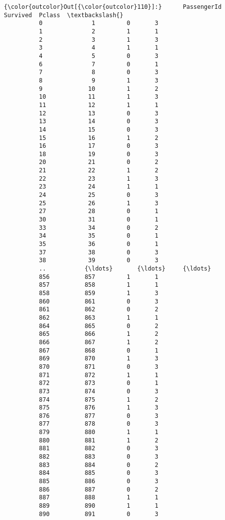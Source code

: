 \documentclass[11pt]{article}
\begin{document}
\begin{Verbatim}[commandchars=\\\{\}]
{\color{outcolor}Out[{\color{outcolor}110}]:}      PassengerId  Survived  Pclass  \textbackslash{}
          0              1         0       3   
          1              2         1       1   
          2              3         1       3   
          3              4         1       1   
          4              5         0       3   
          6              7         0       1   
          7              8         0       3   
          8              9         1       3   
          9             10         1       2   
          10            11         1       3   
          11            12         1       1   
          12            13         0       3   
          13            14         0       3   
          14            15         0       3   
          15            16         1       2   
          16            17         0       3   
          18            19         0       3   
          20            21         0       2   
          21            22         1       2   
          22            23         1       3   
          23            24         1       1   
          24            25         0       3   
          25            26         1       3   
          27            28         0       1   
          30            31         0       1   
          33            34         0       2   
          34            35         0       1   
          35            36         0       1   
          37            38         0       3   
          38            39         0       3   
          ..           {\ldots}       {\ldots}     {\ldots}   
          856          857         1       1   
          857          858         1       1   
          858          859         1       3   
          860          861         0       3   
          861          862         0       2   
          862          863         1       1   
          864          865         0       2   
          865          866         1       2   
          866          867         1       2   
          867          868         0       1   
          869          870         1       3   
          870          871         0       3   
          871          872         1       1   
          872          873         0       1   
          873          874         0       3   
          874          875         1       2   
          875          876         1       3   
          876          877         0       3   
          877          878         0       3   
          879          880         1       1   
          880          881         1       2   
          881          882         0       3   
          882          883         0       3   
          883          884         0       2   
          884          885         0       3   
          885          886         0       3   
          886          887         0       2   
          887          888         1       1   
          889          890         1       1   
          890          891         0       3   
          

\end{Verbatim}
\end{document}
